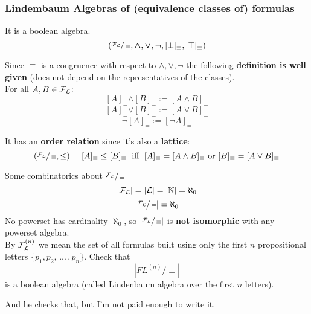 \documentclass[11pt]{article}
\begin{document}
	\newpage
	
	\subsubsection{Lindembaum Algebras of (equivalence classes of) formulas}
	It is a boolean algebra.\\
	
	$$ (\sfrac{\mathcal{F}_\mathcal{L}}{\equiv}, \bm{\wedge}, \bm{\vee}, \bm{\neg}, [\bot]_\equiv, [\top]_\equiv) $$
	
	Since $\equiv$ is a congruence with respect to $\wedge, \vee, \neg$ the following \textbf{definition is well given} (does not depend on the representatives of the classes).\\
	
	For all $A, B \in \mathcal{F}_\mathcal{L}$:
	$$ [A]_\equiv \bm{\wedge} [B]_\equiv := [A \wedge B]_\equiv $$
	$$ [A]_\equiv \bm{\vee} [B]_\equiv := [A \vee B]_\equiv $$
	$$ \neg [A]_\equiv := [\neg A]_\equiv $$
	
	It has an \textbf{order relation} since it's also a \textbf{lattice}: 
	$$ (\sfrac{\mathcal{F}_\mathcal{L}}{\equiv}, \leq) \;\;\;\;\; [A]_\equiv \leq [B]_\equiv  \; \text{ iff } \; [A]_\equiv = [A \wedge B]_\equiv \text{ or } [B]_\equiv = [A \vee B]_\equiv $$
	
	Some combinatorics about $\sfrac{\mathcal{F}_\mathcal{L}}{\equiv}$
	$$ |\mathcal{F}_\mathcal{L}| = |\mathcal{L}| = |\mathbb{N}| = \aleph_0 $$
	$$ |\sfrac{\mathcal{F}_\mathcal{L}}{\equiv}| = \aleph_0 $$
	No powerset has cardinality $\aleph_0$, so $|\sfrac{\mathcal{F}_\mathcal{L}}{\equiv}|$ is \textbf{not isomorphic} with any powerset algebra.\\
	
	By $\mathcal{F}_\mathcal{L}^{(n)}$ we mean the set of all formulas built using only the first $n$ propositional letters $\{p_1, p_2, \, ... \, , p_n\}$. Check that  %
	$$ |FL^{(n)}/\equiv|$$
	is a boolean algebra (called Lindenbaum algebra over the first $n$ letters).\\
	
	\vfill 
	
	And he checks that, but I'm not paid enough to write it.\\
	
	
	
	
\end{document}

